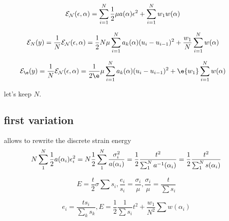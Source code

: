\documentclass[]{article}
\begin{document}

\begin{align}
    \label{eq:energy}
    {\cal E_N}(\epsilon,\alpha) & = \sum_{i=1}^N   \frac{1}{2}\mu a(\alpha) \epsilon^2+ \sum_{i=1}^N w_1 w(\alpha) 
\end{align}


\begin{align}
    \label{eq:energy}
    {\cal E}_N(y) =\frac{1}{N}{\cal E_N}(\epsilon,\alpha) & = \frac{1}{2}N \mu \sum_{i=1}^N a_k(\alpha) ({u_{i}-u_{i-1}})^2+ \frac{w_1 }{N}\sum_{i=1}^N w(\alpha) 
\end{align}

\begin{align}
    \label{eq:energy}
    {\cal E}_\e(y) =\frac{1}{N}{\cal E_N}(\epsilon,\alpha) & = \frac{1}{2\e} \mu \sum_{i=1}^N a_k(\alpha) ({u_{i}-u_{i-1}})^2+ \e{w_1 }\sum_{i=1}^N w(\alpha) 
\end{align}

let's keep $ N$.


\subsection{first variation}
allows to rewrite the discrete strain energy
\begin{align}
    N\sum_{1}^N\frac{1}{2} a(\alpha_i)  \epsilon_i^2 = N \frac{1}{2} \sum_{1}^N  \frac{\sigma_i^2}{a(\alpha_i)} 
    = \frac{1}{2} \frac{t^2}{\sum_{1}^N a^{-1}(\alpha_i)}
    = \frac{1}{2} \frac{t^2}{\sum_{1}^N s(\alpha_i)}
\end{align} 


\begin{equation}
    \label{eqn:}
    E = \frac{t}{2}\sigma\sum s_i, \frac{e_i}{s_i} = \frac{\sigma_i}{\mu}, \frac{\sigma_i}{\mu}=\frac{t}{\sum s_i}
\end{equation}

\begin{equation}
    \label{eqn:}
    e_i = \frac{ts_i}{\sum_k s_k}, E =\frac{1}{2}\frac{1}{\sum s_i}t^2 + \frac{w_1}{N^2}\sum w(\alpha_i)
\end{equation}
\end{document}

